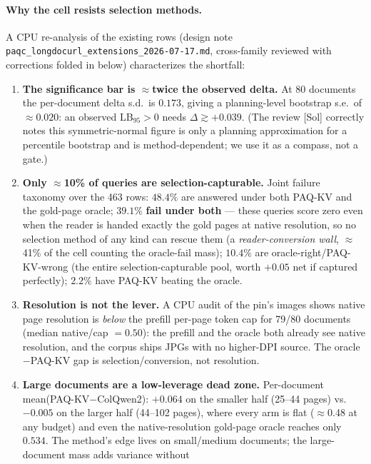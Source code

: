\documentclass[11pt,letterpaper]{article}
\newcommand{\paqc}{\textsc{PAQ-KV}}
\newcommand{\lb}{\mathrm{LB}_{95}}
\begin{document}
\paragraph{Why the cell resists selection methods.} A CPU re-analysis of the existing rows
(design note \texttt{paqc\_longdocurl\_extensions\_2026-07-17.md}, cross-family reviewed with
corrections folded in below) characterizes the shortfall:
\begin{enumerate}
  \item \textbf{The significance bar is $\approx$twice the observed delta.} At 80 documents
        the per-document delta s.d.\ is $0.173$, giving a planning-level bootstrap s.e.\ of
        $\approx0.020$: an observed $\lb>0$ needs $\Delta \gtrsim +0.039$. (The review [Sol]
        correctly notes this symmetric-normal figure is only a planning approximation for a
        percentile bootstrap and is method-dependent; we use it as a compass, not a gate.)
  \item \textbf{Only $\approx$10\% of queries are selection-capturable.} Joint failure
        taxonomy over the 463 rows: $48.4\%$ are answered under both \paqc{} and the gold-page
        oracle; $\mathbf{39.1\%}$ \textbf{fail under both} --- these queries score zero even
        when the reader is handed exactly the gold pages at native resolution, so no selection
        method of any kind can rescue them (a \emph{reader-conversion wall}, $\approx$41\% of
        the cell counting the oracle-fail mass); $10.4\%$ are oracle-right/\paqc{}-wrong (the
        entire selection-capturable pool, worth $+0.05$ net if captured perfectly); $2.2\%$
        have \paqc{} beating the oracle.
  \item \textbf{Resolution is not the lever.} A CPU audit of the pin's images shows native
        page resolution is \emph{below} the prefill per-page token cap for 79/80 documents
        (median native/cap $=0.50$): the prefill and the oracle both already see native
        resolution, and the corpus ships JPGs with no higher-DPI source. The
        oracle$-$\paqc{} gap is selection/conversion, not resolution.
  \item \textbf{Large documents are a low-leverage dead zone.} Per-document
        mean(\paqc{}$-$ColQwen2): $+0.064$ on the smaller half (25--44 pages) vs.\ $-0.005$ on
        the larger half (44--102 pages), where every arm is flat ($\approx$0.48 at any budget)
        and even the native-resolution gold-page oracle reaches only $0.534$. The method's
        edge lives on small/medium documents; the large-document mass adds variance without

\end{enumerate}
\end{document}
